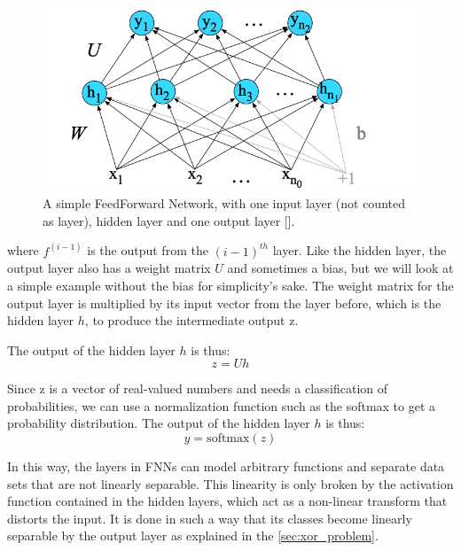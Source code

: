 \begin{figure}
  \centering
  \includegraphics[width=0.7\linewidth]{Pictures/fnn_layers.png}
  \caption{A simple FeedForward Network, with one input layer (not counted as layer), hidden layer and one output layer [\cite{Jurafsky2009}]. }
  \label{fig:fnn_layers}
\end{figure}



where $f^{(i-1)}$ is the output from the $(i-1)^{th}$ layer.
Like the hidden layer, the output layer also has a weight matrix $U$ and sometimes a bias, but we will look at a simple example without the bias for simplicity’s sake.
The weight matrix for the output layer is multiplied by its input vector from the layer before, which is the hidden layer $h$, to produce the intermediate output z.

The output of the hidden layer $h$ is thus:
\begin{equation}
  z = U h
\end{equation}

Since z is a vector of real-valued numbers and needs a classification of probabilities, we can use a normalization function such as the softmax to get a probability distribution.
The output of the hidden layer $h$ is thus:
\begin{equation}
  y = \text{softmax}(z)
\end{equation}

In this way, the layers in FNNs can model arbitrary functions and separate data sets that are not linearly separable. This linearity is only broken by the activation function contained in the hidden layers, which act as a non-linear transform that distorts the input. It is done in such a way that its classes become linearly separable by the output layer as explained in the \ref{sec:xor_problem}.

